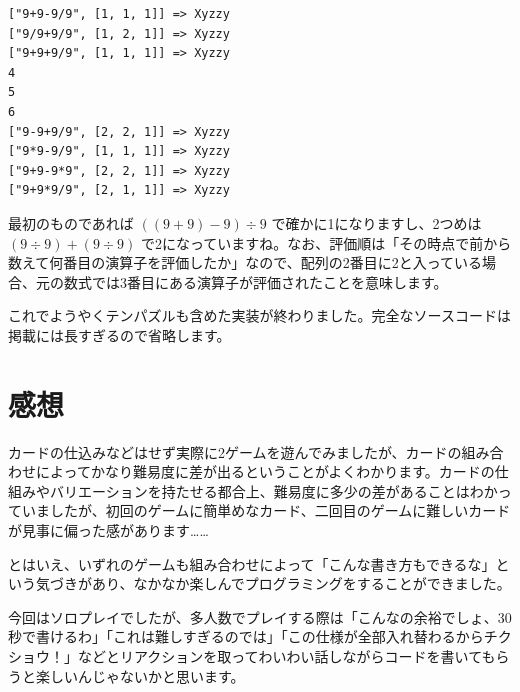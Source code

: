 \documentclass[index]{subfiles}
\begin{document}
\begin{lstlisting}
["9+9-9/9", [1, 1, 1]] => Xyzzy
["9/9+9/9", [1, 2, 1]] => Xyzzy
["9+9+9/9", [1, 1, 1]] => Xyzzy
4
5
6
["9-9+9/9", [2, 2, 1]] => Xyzzy
["9*9-9/9", [1, 1, 1]] => Xyzzy
["9+9-9*9", [2, 2, 1]] => Xyzzy
["9+9*9/9", [2, 1, 1]] => Xyzzy
\end{lstlisting}

最初のものであれば $((9 + 9) - 9) \div 9$ で確かに1になりますし、2つめは $(9 \div 9) + (9 \div 9)$ で2になっていますね。なお、評価順は「その時点で前から数えて何番目の演算子を評価したか」なので、配列の2番目に2と入っている場合、元の数式では3番目にある演算子が評価されたことを意味します。

これでようやくテンパズルも含めた実装が終わりました。完全なソースコードは掲載には長すぎるので省略します。

  \section{感想}
  
  カードの仕込みなどはせず実際に2ゲームを遊んでみましたが、カードの組み合わせによってかなり難易度に差が出るということがよくわかります。カードの仕組みやバリエーションを持たせる都合上、難易度に多少の差があることはわかっていましたが、初回のゲームに簡単めなカード、二回目のゲームに難しいカードが見事に偏った感があります……
  
  とはいえ、いずれのゲームも組み合わせによって「こんな書き方もできるな」という気づきがあり、なかなか楽しんでプログラミングをすることができました。

  今回はソロプレイでしたが、多人数でプレイする際は「こんなの余裕でしょ、30秒で書けるわ」「これは難しすぎるのでは」「この仕様が全部入れ替わるからチクショウ！」などとリアクションを取ってわいわい話しながらコードを書いてもらうと楽しいんじゃないかと思います。
\end{document}

